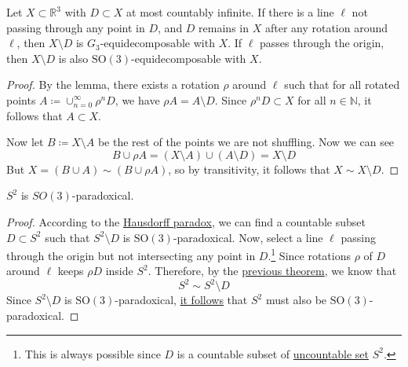   \begin{theorem}
    \label{thm:equi-irrational}
    Let $X \subset \mathbb{R}^3$ with $D \subset X$ at most countably infinite. If there is a line $\ell$ not passing through any point in $D$, and $D$ remains in $X$ after any rotation around $\ell$, then $X \setminus D$ is $G_3$-equidecomposable with $X$. If $\ell$ passes through the origin, then $X \setminus D$ is also $\mathrm{SO}(3)$-equidecomposable with $X$. 
  \end{theorem}
  \begin{proof}
    By the lemma, there exists a rotation $\rho$ around $\ell$ such that for all rotated points $A \coloneqq \cup_{n=0}^\infty \rho^n D$, we have $\rho A = A \setminus D$. Since $\rho^n D \subset X$ for all $n \in \mathbb{N}$, it follows that $A \subset X$. 

    Now let $B \coloneqq X \setminus A$ be the rest of the points we are not shuffling. Now we can see
    \begin{equation}
      B \cup \rho A = (X \setminus A) \cup (A \setminus D) = X \setminus D
    \end{equation}
    But $X = (B \cup A) \sim (B \cup \rho A)$, so by transitivity, it follows that $X \sim X \setminus D$. 
  \end{proof}

  \begin{theorem}
    \label{thm:paradoxical-sphere}
    $S^2$ is $SO(3)$-paradoxical. 
  \end{theorem} 
  \begin{proof}
    According to the \hyperref[thm:hausdorff]{Hausdorff paradox}, we can find a countable subset $D \subset S^2$ such that $S^2 \setminus D$ is $\mathrm{SO}(3)$-paradoxical. Now, select a line $\ell$ passing through the origin but not intersecting any point in $D$.\footnote{This is always possible since $D$ is a countable subset of \hyperref[def:uncountable-set]{uncountable set} $S^2$.} Since rotations $\rho$ of $D$ around $\ell$ keeps $\rho D$ inside $S^2$. Therefore, by the \hyperref[thm:equi-irrational]{previous theorem}, we know that 
    \begin{equation}
      S^2 \sim S^2 \setminus D
    \end{equation}
    Since $S^2 \setminus D$ is $\mathrm{SO}(3)$-paradoxical, \hyperref[thm:equi-paradox]{it follows} that $S^2$ must also be $\mathrm{SO}(3)$-paradoxical. 
  \end{proof}

